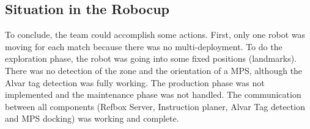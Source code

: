 \subsection{Situation in the Robocup}

To conclude, the team could accomplish some actions. First, only one robot was moving for each match because there was no multi-deployment. To do the exploration phase, the robot was going into some fixed positions (landmarks). There was no detection of the zone and the orientation of a MPS, although the Alvar tag detection was fully working. The production phase was not implemented and the maintenance phase was not handled. The communication between all components (Refbox Server, Instruction planer, Alvar Tag detection and MPS docking) was working and complete. 